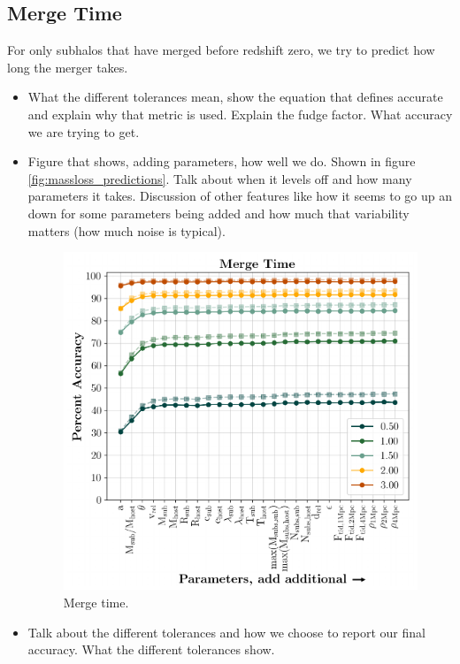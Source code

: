 \documentclass[fleqn,usenatbib]{mnras}
\begin{document}
\subsection{Merge Time}
\label{sec:merge time}
For only subhalos that have merged before redshift zero, we try to predict how long the merger takes.
\begin{itemize}
	\item {} What the different tolerances mean, show the equation that defines accurate and explain why that metric is used. Explain the fudge factor. What accuracy we are trying to get.
	\item Figure that shows, adding parameters, how well we do. Shown in figure \ref{fig:massloss_predictions}. Talk about when it levels off and how many parameters it takes. Discussion of other features like how it seems to go up an down for some parameters being added and how much that variability matters (how much noise is typical).
\begin{figure}
	\includegraphics[width=\columnwidth]{Figures/time_predictions}
    \caption{Merge time.}
    \label{fig:time_predictions}
\end{figure}
    \item Talk about the different tolerances and how we choose to report our final accuracy. What the different tolerances show.

\end{itemize}
\end{document}
